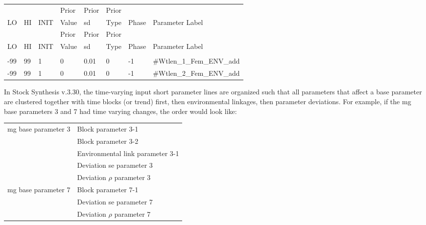 \begin{longtable}{p{0.7cm} p{0.7cm} p{0.7cm} p{1cm} p{1.4cm} p{1cm} p{1cm} p{6.7cm}}
	\hline
	   &    &      & Prior & Prior    & Prior &  & \Tstrut\\
	LO & HI & INIT & Value & \gls{sd} & Type  & Phase & Parameter Label \Bstrut\\
	\hline
	\endfirsthead
	
	\hline
	   &    &      & Prior & Prior & Prior &  & \Tstrut\\
	LO & HI & INIT & Value & \gls{sd}    & Type  & Phase & Parameter Label \Bstrut\\
	\hline
	\endhead
	
	\endfoot
	
	\endlastfoot
	
	\multicolumn{7}{l}{COND: Only if \gls{mg} parameters are time-varying} \Tstrut\\
	-99 & 99 & 1 & 0 & 0.01 & 0 & -1 &\#Wtlen\_1\_Fem\_ENV\_add \Tstrut\\
	-99 & 99 & 1 & 0 & 0.01 & 0 & -1 &\#Wtlen\_2\_Fem\_ENV\_add \Bstrut\\
	\hline
\end{longtable}

In Stock Synthesis v.3.30, the time-varying input short parameter lines are organized such that all parameters that affect a base parameter are clustered together with time blocks (or trend) first, then environmental linkages, then parameter deviations. For example, if the \gls{mg} base parameters 3 and 7 had time varying changes, the order would look like:
 
 \begin{center}
 	\begin{longtable}{p{5cm} p{10cm}}
 		\hline
 		\gls{mg} base parameter 3 & Block parameter 3-1 \Tstrut\\
 		& Block parameter 3-2 \\
 		& Environmental link parameter 3-1 \\
 		& Deviation \gls{se} parameter 3 \\
 		& Deviation $\rho$ parameter 3 \Bstrut\\
 		\gls{mg} base parameter 7 & Block parameter 7-1 \\
 		& Deviation \gls{se} parameter 7 \\
 		& Deviation $\rho$ parameter 7 \Bstrut\\
 		\hline	 	                    		
 	\end{longtable}
 \end{center}
 
